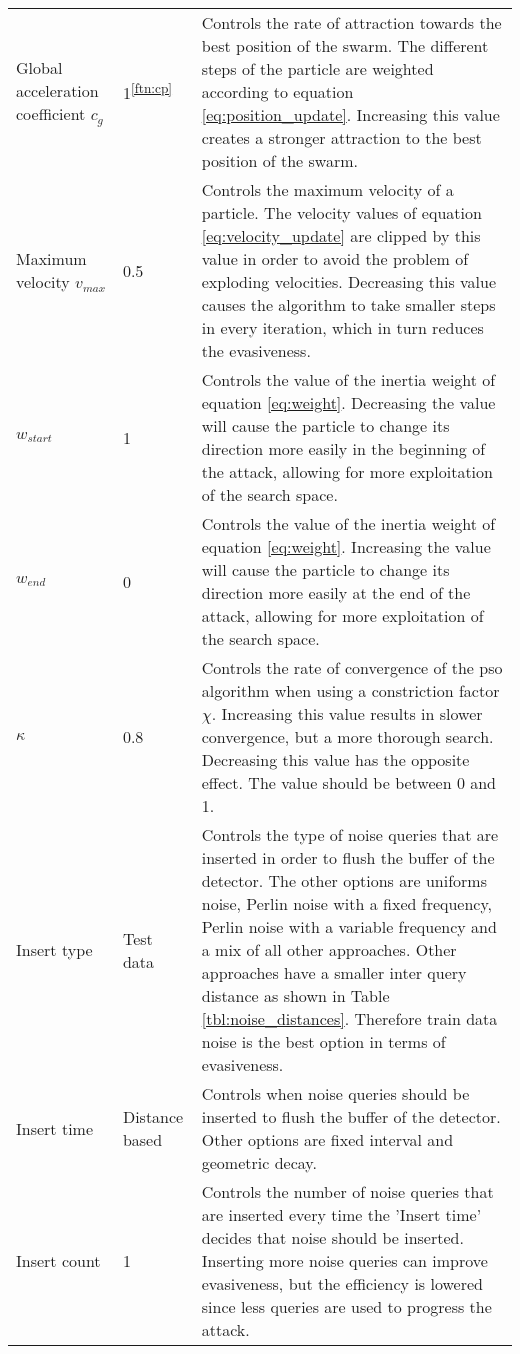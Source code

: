 \begin{longtable}{p{3cm}p{2.5cm}p{7cm}}
Global acceleration coefficient $c_g$ &1\textsuperscript{\ref{ftn:cp}} &Controls the rate of attraction towards the best position of the swarm. The different steps of the particle are weighted according to equation \ref{eq:position_update}. Increasing this value creates a stronger attraction to the best position of the swarm.\\
Maximum velocity $v_{max}$ &0.5 &Controls the maximum velocity of a particle. The velocity values of equation \ref{eq:velocity_update} are clipped by this value in order to avoid the problem of exploding velocities. Decreasing this value causes the algorithm to take smaller steps in every iteration, which in turn reduces the evasiveness.\\
$w_{start}$ &1 &Controls the value of the inertia weight of equation \ref{eq:weight}. Decreasing the value will cause the particle to change its direction more easily in the beginning of the attack, allowing for more exploitation of the search space.\\
$w_{end}$ &0 &Controls the value of the inertia weight of equation \ref{eq:weight}. Increasing the value will cause the particle to change its direction more easily at the end of the attack, allowing for more exploitation of the search space.\\
$\kappa$ &0.8 &Controls the rate of convergence of the \gls{pso} algorithm when using a constriction factor $\chi$. Increasing this value results in slower convergence, but a more thorough search. Decreasing this value has the opposite effect. The value should be between 0 and 1.\\
Insert type &Test data &Controls the type of noise queries that are inserted in order to flush the buffer of the detector. The other options are uniforms noise, Perlin noise with a fixed frequency, Perlin noise with a variable frequency and a mix of all other approaches. Other approaches have a smaller inter query distance as shown in Table \ref{tbl:noise_distances}. Therefore train data noise is the best option in terms of evasiveness.\\
Insert time &Distance based &Controls when noise queries should be inserted to flush the buffer of the detector. Other options are fixed interval and geometric decay.\\
Insert count &1 &Controls the number of noise queries that are inserted every time the 'Insert time' decides that noise should be inserted. Inserting more noise queries can improve evasiveness, but the efficiency is lowered since less queries are used to progress the attack.\\

\end{longtable}
